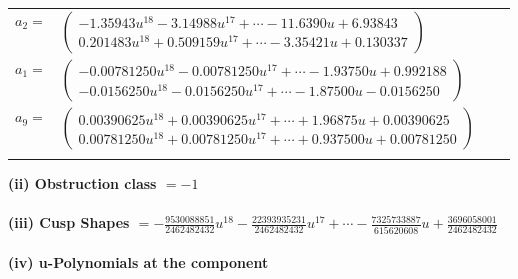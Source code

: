 \documentclass[1p]{elsarticle_modified}
\theoremstyle{definition}
\begin{document}
\begin{tabular}{m{7pt} m{180pt} m{7pt} m{180pt} }
\flushright $a_{2}=$&$\begin{pmatrix}-1.35943 u^{18}-3.14988 u^{17}+\cdots-11.6390 u+6.93843\\0.201483 u^{18}+0.509159 u^{17}+\cdots-3.35421 u+0.130337\end{pmatrix}$ \\
\flushright $a_{1}=$&$\begin{pmatrix}-0.00781250 u^{18}-0.00781250 u^{17}+\cdots-1.93750 u+0.992188\\-0.0156250 u^{18}-0.0156250 u^{17}+\cdots-1.87500 u-0.0156250\end{pmatrix}$ \\
\flushright $a_{9}=$&$\begin{pmatrix}0.00390625 u^{18}+0.00390625 u^{17}+\cdots+1.96875 u+0.00390625\\0.00781250 u^{18}+0.00781250 u^{17}+\cdots+0.937500 u+0.00781250\end{pmatrix}$\\&\end{tabular}
\flushleft \textbf{(ii) Obstruction class $= -1$}\\~\\
\flushleft \textbf{(iii) Cusp Shapes $= -\frac{9530088851}{2462482432} u^{18}-\frac{22393935231}{2462482432} u^{17}+\cdots-\frac{7325733887}{615620608} u+\frac{3696058001}{2462482432}$}\\~\\
\newpage\renewcommand{\arraystretch}{1}
\flushleft \textbf{(iv) u-Polynomials at the component}\newline \\
\end{document}
